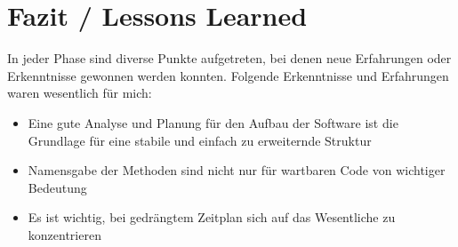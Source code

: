 \section{Fazit / Lessons Learned}

In jeder Phase sind diverse Punkte aufgetreten, bei denen neue Erfahrungen oder Erkenntnisse gewonnen werden konnten. Folgende Erkenntnisse und Erfahrungen waren wesentlich für mich:

\begin{itemize}
  \item Eine gute Analyse und Planung für den Aufbau der Software ist die Grundlage für eine stabile und einfach zu erweiternde Struktur
  \item Namensgabe der Methoden sind nicht nur für wartbaren Code von wichtiger Bedeutung
  \item Es ist wichtig, bei gedrängtem Zeitplan sich auf das Wesentliche zu konzentrieren
\end{itemize}

